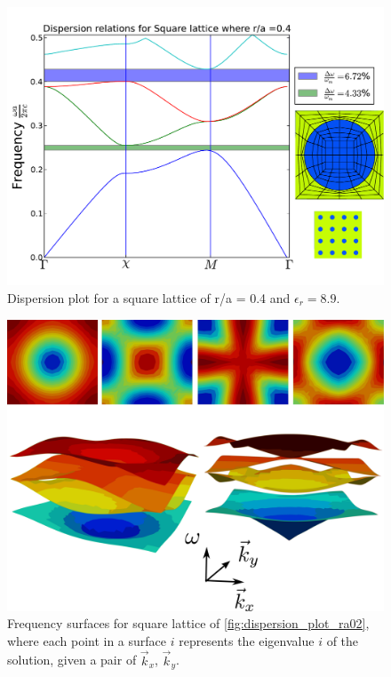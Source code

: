 \begin{figure}
\centering
\includegraphics[scale=0.6]{./img/square_lattice_ra04.pdf}
\caption{Dispersion plot for a square lattice of r/a = 0.4 and $\epsilon_r = 8.9$.}
\label{fig:dispersion_plot_ra04}
\end{figure}

\begin{figure}
\centering
\includegraphics[scale=0.1]{./img/energy_surfaces.pdf}
\caption{Frequency surfaces for square lattice of \ref{fig:dispersion_plot_ra02}, where each point in a surface $i$ represents the eigenvalue $i$ of the solution, given a pair of $\vec{k}_x$, $\vec{k}_y$.}
\label{fig:frequency_surfaces}
\end{figure}